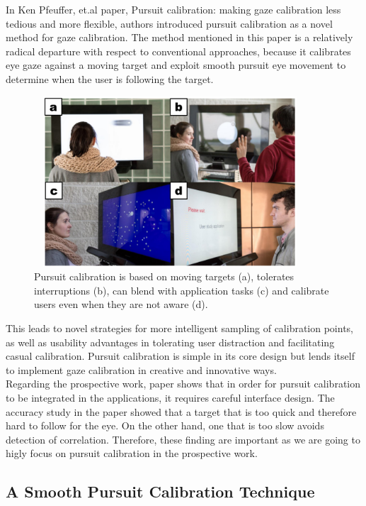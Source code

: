 In Ken Pfeuffer, et.al \cite{4} paper, Pursuit calibration: making gaze calibration less tedious and more flexible, authors introduced pursuit calibration as a novel method for gaze calibration. The method mentioned in this paper is a relatively radical departure with respect to conventional approaches, because it calibrates eye gaze against a moving target and exploit smooth pursuit eye movement to determine when the user is following the target. 
\begin{figure}[!hbt]
  \centering
  \includegraphics[width=4in,height=2.5in]{kenpfeffer.png}
  \caption{Pursuit calibration is based on moving targets (a), tolerates interruptions (b), can blend with application tasks (c) and calibrate users even when they are not aware (d).}
  \label{kenpfeffer}
\end{figure}

This leads to novel strategies for more intelligent sampling of calibration points, as well as usability advantages in tolerating user distraction and facilitating casual calibration. Pursuit calibration is simple in its core design but lends itself to implement gaze calibration in creative and innovative ways.\\

Regarding the prospective work, paper shows that in order for pursuit calibration to be integrated in the applications, it requires careful interface design. The accuracy study in the paper showed that a target that is too quick and therefore hard to follow for the eye. On the other hand, one that is too slow avoids detection of correlation. Therefore, these finding are important as we are going to higly focus on pursuit calibration in the prospective work.

\subsection{A Smooth Pursuit Calibration Technique}

